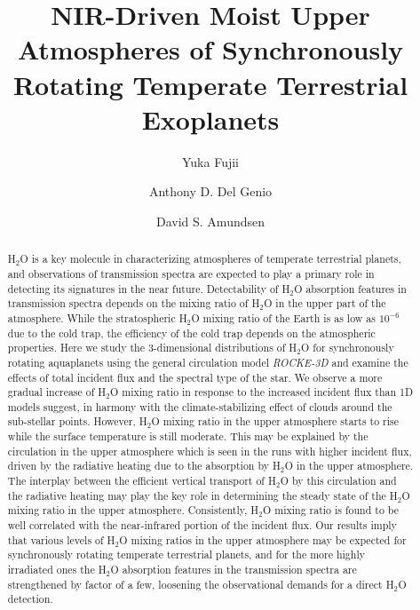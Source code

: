 \documentclass[11pt,numberedappendix,twocolappendix,]{emulateapj}
\def\water{H$_2$O }
\begin{document}
\title{NIR-Driven Moist Upper Atmospheres of Synchronously Rotating Temperate Terrestrial Exoplanets}
\author{Yuka Fujii}
\author{Anthony D. Del Genio}
\author{David S. Amundsen}

\begin{abstract}

\water is a key molecule in characterizing atmospheres of temperate terrestrial planets, and observations of transmission spectra are expected to play a primary role in detecting its signatures in the near future. 
%
Detectability of \water absorption features in transmission spectra depends on the mixing ratio of \water in the upper part of the atmosphere. 
%
While the stratospheric \water mixing ratio of the Earth is as low as $10^{-6}$ due to the cold trap, the efficiency of the cold trap depends on the atmospheric properties. 
%
Here we study the 3-dimensional distributions of \water for synchronously rotating aquaplanets using the general circulation model {\it ROCKE-3D} and examine the effects of total incident flux and the spectral type of the star.  
%
We observe a more gradual increase of \water mixing ratio in response to the increased incident flux than 1D models suggest, in harmony with the climate-stabilizing effect of clouds around the sub-stellar points. 
%
However, \water mixing ratio in the upper atmosphere starts to rise while the surface temperature is still moderate. 
%
This may be explained by the circulation in the upper atmosphere which is seen in the runs with higher incident flux, driven by the radiative heating due to the absorption by \water in the upper atmosphere. 
%
The interplay between the efficient vertical transport of \water by this circulation and the radiative heating may play the key role in determining the steady state of the \water mixing ratio in the upper atmosphere.  
%
Consistently, \water mixing ratio is found to be well correlated with the near-infrared portion of the incident flux. 
%
Our results imply that various levels of \water mixing ratios in the upper atmosphere may be expected for synchronously rotating temperate terrestrial planets, and for the more highly irradiated ones the \water absorption features in the transmission spectra are strengthened by factor of a few, loosening the observational demands for a direct H$_2$O detection. 
%
\end{abstract}
\end{document}
